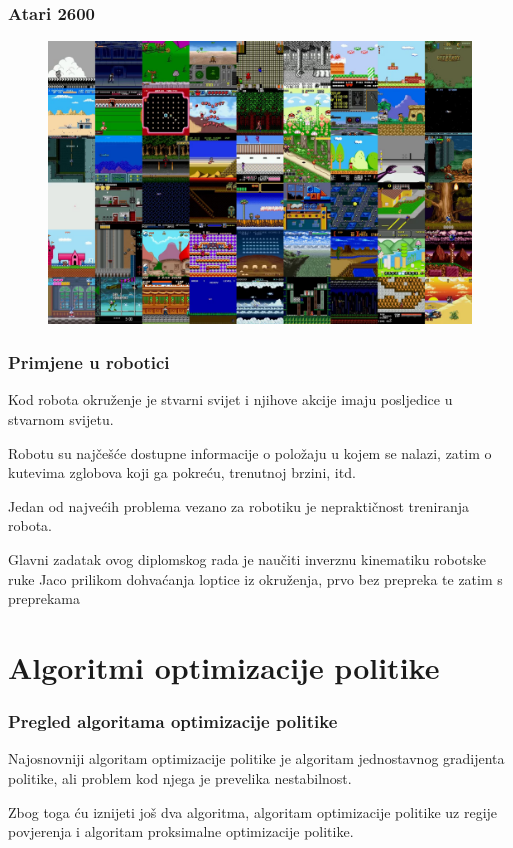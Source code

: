 \documentclass{beamer}
\begin{document}
\begin{frame}
	\frametitle{Atari 2600}

	\begin{figure}[ht!]
		\centering
		\includegraphics[width=\columnwidth]{img/atari.png}
		\label{fig:atari}
	\end{figure}
\end{frame}

\begin{frame}
	\frametitle{Primjene u robotici}

	Kod robota okruženje je stvarni svijet i njihove akcije imaju posljedice u stvarnom svijetu.
	\bigskip

	Robotu su najčešće dostupne informacije o položaju u kojem se nalazi, zatim o kutevima zglobova koji ga pokreću, trenutnoj brzini, itd.
	\bigskip

	Jedan od najvećih problema vezano za robotiku je nepraktičnost treniranja robota.
	\bigskip

	Glavni zadatak ovog diplomskog rada je naučiti inverznu kinematiku robotske ruke Jaco prilikom dohvaćanja loptice iz okruženja, prvo bez prepreka te zatim s preprekama

\end{frame}

\section{Algoritmi optimizacije politike}

\begin{frame}
	\frametitle{Pregled algoritama optimizacije politike}

	Najosnovniji algoritam optimizacije politike je algoritam jednostavnog gradijenta politike, ali problem kod njega je prevelika nestabilnost.
	\bigskip

	Zbog toga ću iznijeti još dva algoritma, algoritam optimizacije politike uz regije povjerenja i algoritam proksimalne optimizacije politike.
\end{frame}
\end{document}
